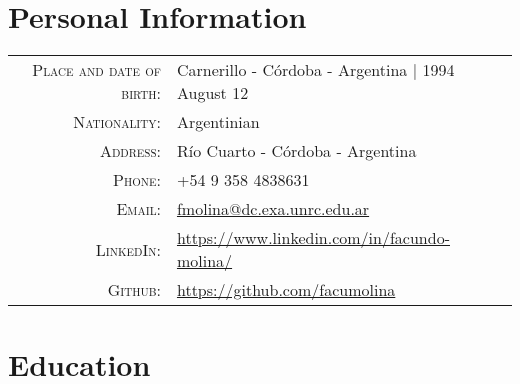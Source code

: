 \documentclass[a4paper,10pt]{article} %
\begin{document}
\pagestyle{empty} %


\par{\bigskip\par} %

\section{Personal Information}

\begin{tabular}{rl}
\\
\textsc{Place and date of birth:} & Carnerillo - Córdoba - Argentina | 1994 August 12 \\
\textsc{Nationality:} & Argentinian \\
\textsc{Address:} & Río Cuarto - Córdoba - Argentina\\
\textsc{Phone:} & +54 9 358 4838631\\
\textsc{Email:} & \href{mailto:fmolina@dc.exa.unrc.edu.ar}{fmolina@dc.exa.unrc.edu.ar} \\
\textsc{LinkedIn:} & \href{https://www.linkedin.com/in/facundo-molina/}{https://www.linkedin.com/in/facundo-molina/} \\
\textsc{Github:} & \href{https://github.com/facumolina}{https://github.com/facumolina}
\end{tabular}


\section{Education}
\end{document}
